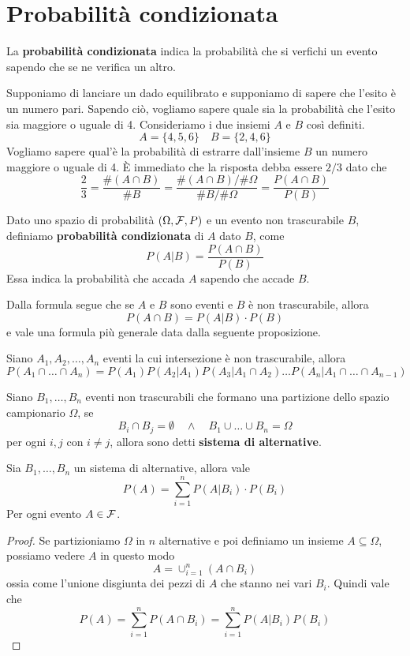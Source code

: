 \section{Probabilità condizionata}
La \textbf{probabilità condizionata} indica la probabilità che si verfichi un evento sapendo che
se ne verifica un altro.

\begin{example}
	Supponiamo di lanciare un dado equilibrato e supponiamo di sapere che l'esito è un numero
	pari. Sapendo ciò, vogliamo sapere quale sia la probabilità che l'esito sia maggiore o uguale
	di 4. Consideriamo i due insiemi $A$ e $B$ così definiti.
	\[ A = \{ 4, 5, 6 \} \quad B = \{ 2, 4, 6 \} \]
	Vogliamo sapere qual'è la probabilità di estrarre dall'insieme $B$ un numero maggiore o uguale
	di 4. \`E immediato che la risposta debba essere $2/3$ dato che
	\[
		\frac{2}{3} = \frac{\# (A \cap B)}{\# B} =
		\frac{\# (A \cap B) / \# \Omega}{\# B / \# \Omega} =
		\frac{P(A \cap B)}{P(B)}
	\]
\end{example}

\begin{definition}
	Dato uno spazio di probabilità $(\Omega, \mathcal{F}, P)$ e un evento non trascurabile $B$, definiamo
	\textbf{probabilità condizionata} di $A$ dato $B$, come
	\[ P(A | B) = \frac{P(A \cap B)}{P(B)} \]
	Essa indica la probabilità che accada $A$ sapendo che accade $B$.
\end{definition}

Dalla formula segue che se $A$ e $B$ sono eventi e $B$ è non trascurabile, allora
\[ P(A \cap B) = P(A | B) \cdot P(B) \]
e vale una formula più generale data dalla seguente proposizione.

\begin{proposition}
	Siano $A_1, A_2, \dots, A_n$ eventi la cui intersezione è non trascurabile, allora
	\[
		P(A_1 \cap  \dots \cap A_n) = P(A_1) P(A_2 | A_1) P(A_3 | A_1 \cap A_2)
		\dots P(A_n | A_1 \cap \dots \cap A_{n-1})
	\]
\end{proposition}

\begin{definition}
	Siano $B_1, \dots, B_n$ eventi non trascurabili che formano una partizione dello spazio
	campionario $\Omega$, se
	\[ B_i \cap B_j = \emptyset \quad \land \quad B_1 \cup \dots \cup B_n = \Omega \]
	per ogni $i,j$ con $i \neq j$, allora sono detti \textbf{sistema di alternative}.
\end{definition}

\begin{theorem}[Fattorizzazione]\label{th: fattorizzazione}
	Sia $B_1, \dots, B_n$ un sistema di alternative, allora vale
	\[ P(A) = \sum_{i=1}^n P(A | B_i) \cdot P(B_i) \]
	Per ogni evento $A \in \mathcal{F}$.
	\begin{proof}
		Se partizioniamo $\Omega$ in $n$ alternative e poi definiamo un insieme
		$A \subseteq \Omega$, possiamo vedere $A$ in questo modo
		\[ A = \cup_{i=1}^n (A \cap B_i) \]
		ossia come l'unione disgiunta dei pezzi di $A$ che stanno nei vari $B_i$. Quindi vale che
		\[ P(A) = \sum_{i=1}^n P(A \cap B_i) = \sum_{i=1}^n P(A | B_i) P(B_i) \]
	\end{proof}
\end{theorem}

